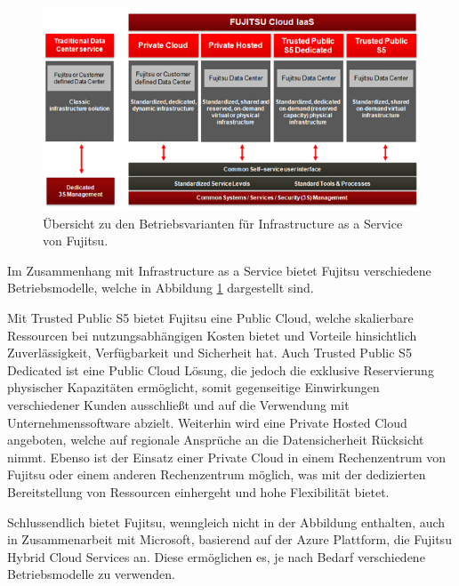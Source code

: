 \begin{figure}
	\centering
	\includegraphics[width=0.8\linewidth]{images/fujitsuModels}
	\caption{Übersicht zu den Betriebsvarianten für Infrastructure as a Service von Fujitsu. \cite{fujitsuIaaS}}
	\label{fig:fujitsuModels}
\end{figure}

Im Zusammenhang mit Infrastructure as a Service bietet Fujitsu verschiedene Betriebsmodelle\cite{fujitsuIaaS}, welche in Abbildung \ref{fig:fujitsuModels} dargestellt sind. 

Mit Trusted Public S5 bietet Fujitsu eine Public Cloud, welche skalierbare Ressourcen bei nutzungsabhängigen Kosten bietet und Vorteile hinsichtlich Zuverlässigkeit, Verfügbarkeit und Sicherheit hat. 
Auch Trusted Public S5 Dedicated ist eine Public Cloud Lösung, die jedoch die exklusive Reservierung physischer Kapazitäten ermöglicht, somit gegenseitige Einwirkungen verschiedener Kunden ausschließt und auf die Verwendung mit Unternehmenssoftware abzielt. 
Weiterhin wird eine Private Hosted Cloud angeboten, welche auf regionale Ansprüche an die Datensicherheit Rücksicht nimmt. 
Ebenso ist der Einsatz einer Private Cloud in einem Rechenzentrum von Fujitsu oder einem anderen Rechenzentrum möglich, was mit der dedizierten Bereitstellung von Ressourcen einhergeht und hohe Flexibilität bietet. 

Schlussendlich bietet Fujitsu, wenngleich nicht in der Abbildung enthalten, auch in Zusammenarbeit mit Microsoft, basierend auf der Azure Plattform, die Fujitsu Hybrid Cloud Services\cite{fujitsuHybrid} an. Diese ermöglichen es, je nach Bedarf verschiedene Betriebsmodelle zu verwenden. 

